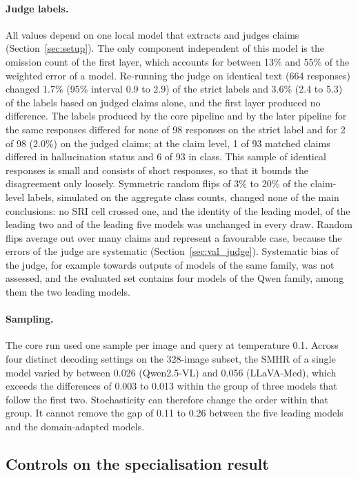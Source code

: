 \documentclass[11pt,a4paper]{article}
\newcommand{\SMHR}{\ensuremath{\mathrm{SMHR}}}
\newcommand{\SRI}{\ensuremath{\mathrm{SRI}}}
\begin{document}
\paragraph{Judge labels.} All values depend on one local model that extracts and judges claims (Section~\ref{sec:setup}). The only component independent of this model is the omission count of the first layer, which accounts for between 13\% and 55\% of the weighted error of a model. Re-running the judge on identical text (664 responses) changed 1.7\% (95\% interval 0.9 to 2.9) of the strict labels and 3.6\% (2.4 to 5.3) of the labels based on judged claims alone, and the first layer produced no difference. The labels produced by the core pipeline and by the later pipeline for the same responses differed for none of 98 responses on the strict label and for 2 of 98 (2.0\%) on the judged claims; at the claim level, 1 of 93 matched claims differed in hallucination status and 6 of 93 in class. This sample of identical responses is small and consists of short responses, so that it bounds the disagreement only loosely. Symmetric random flips of 3\% to 20\% of the claim-level labels, simulated on the aggregate class counts, changed none of the main conclusions: no \SRI{} cell crossed one, and the identity of the leading model, of the leading two and of the leading five models was unchanged in every draw. Random flips average out over many claims and represent a favourable case, because the errors of the judge are systematic (Section~\ref{sec:val_judge}). Systematic bias of the judge, for example towards outputs of models of the same family, was not assessed, and the evaluated set contains four models of the Qwen family, among them the two leading models.

\paragraph{Sampling.} The core run used one sample per image and query at temperature 0.1. Across four distinct decoding settings on the 328-image subset, the \SMHR{} of a single model varied by between 0.026 (Qwen2.5-VL) and 0.056 (LLaVA-Med), which exceeds the differences of 0.003 to 0.013 within the group of three models that follow the first two. Stochasticity can therefore change the order within that group. It cannot remove the gap of 0.11 to 0.26 between the five leading models and the domain-adapted models.

\subsection{Controls on the specialisation result}
\label{subsec:res_controls}
\end{document}
